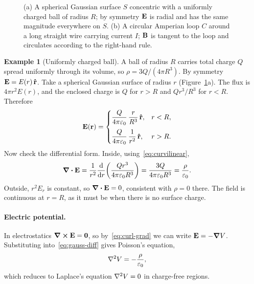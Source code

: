 \documentclass[11pt,a4paper]{article}
\theoremstyle{definition}
\newtheorem{example}{Example}[section]
\theoremstyle{remark}
\newcommand{\E}{\vb{E}}
\newcommand{\B}{\vb{B}}
\newcommand{\eps}{\varepsilon_0}
\begin{document}
\begin{figure}[ht]
  \centering
  
  \caption{(a) A spherical Gaussian surface $S$ concentric with a uniformly charged ball of radius $R$; by symmetry $\E$ is radial and has the same magnitude everywhere on $S$. (b) A circular Amperian loop $C$ around a long straight wire carrying current $I$; $\B$ is tangent to the loop and circulates according to the right-hand rule.}
  \label{fig:gauss-ampere}
\end{figure}

\begin{example}[Uniformly charged ball]\label{ex:ball}
A ball of radius $R$ carries total charge $Q$ spread uniformly through its volume, so $\rho = 3Q/(4\pi R^3)$. By symmetry $\E = E(r)\,\vu{r}$. Take a spherical Gaussian surface of radius $r$ (Figure~\ref{fig:gauss-ampere}a). The flux is $4\pi r^2 E(r)$, and the enclosed charge is $Q$ for $r > R$ and $Q r^3/R^3$ for $r < R$. Therefore
\begin{equation}\label{eq:ball-field}
  \E(\vb{r}) =
  \begin{cases}
    \dfrac{Q}{4\pi\eps}\,\dfrac{r}{R^3}\,\vu{r}, & r < R,\\[10pt]
    \dfrac{Q}{4\pi\eps}\,\dfrac{1}{r^2}\,\vu{r}, & r > R.
  \end{cases}
\end{equation}
Now check the differential form. Inside, using~\eqref{eq:curvilinear},
\[
  \div{\E} = \frac{1}{r^2}\dv{r}\qty(\frac{Q r^3}{4\pi\eps R^3}) = \frac{3Q}{4\pi\eps R^3} = \frac{\rho}{\eps}.
\]
Outside, $r^2 E_r$ is constant, so $\div{\E} = 0$, consistent with $\rho = 0$ there. The field is continuous at $r = R$, as it must be when there is no surface charge.
\end{example}

\paragraph{Electric potential.} In electrostatics $\curl{\E} = \vb{0}$, so by~\eqref{eq:curl-grad} we can write $\E = -\grad{V}$. Substituting into~\eqref{eq:gauss-diff} gives Poisson's equation,
\begin{equation}\label{eq:poisson}
  \laplacian{V} = -\frac{\rho}{\eps},
\end{equation}
which reduces to Laplace's equation $\laplacian{V} = 0$ in charge-free regions.

\end{document}
